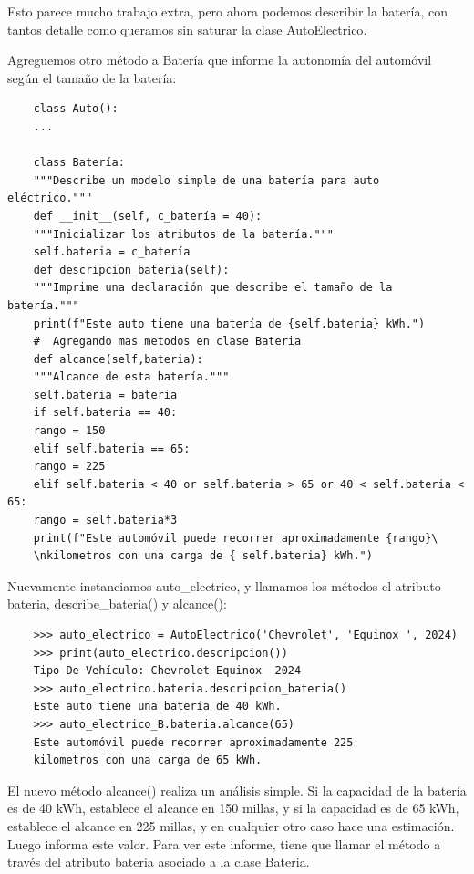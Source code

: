 {Esto parece mucho trabajo extra, pero ahora podemos describir la batería, 
con tantos detalle como queramos sin saturar la clase {\ttfamily AutoElectrico}. 

Agreguemos otro método a Batería que informe la autonomía del automóvil según el tamaño de la batería:

\hspace{-2.7cm}{\ttfamily \scriptsize composicion}

\vspace{-0.2cm}
\hspace{-2.3cm}{\ttfamily \scriptsize \_Auto.py}\vspace{-0.88cm}
\begin{lstlisting}
	class Auto():
	...
	
	class Batería:
	"""Describe un modelo simple de una batería para auto eléctrico."""
	def __init__(self, c_batería = 40):
	"""Inicializar los atributos de la batería."""
	self.bateria = c_batería
	def descripcion_bateria(self):
	"""Imprime una declaración que describe el tamaño de la batería."""        
	print(f"Este auto tiene una batería de {self.bateria} kWh.")
	#  Agregando mas metodos en clase Bateria
	def alcance(self,bateria):
	"""Alcance de esta batería."""
	self.bateria = bateria
	if self.bateria == 40:
	rango = 150
	elif self.bateria == 65:
	rango = 225
	elif self.bateria < 40 or self.bateria > 65 or 40 < self.bateria < 65:
	rango = self.bateria*3
	print(f"Este automóvil puede recorrer aproximadamente {rango}\
	\nkilometros con una carga de { self.bateria} kWh.")
\end{lstlisting}

Nuevamente instanciamos {\ttfamily auto\_electrico}, y llamamos los métodos el atributo {\ttfamily  bateria}, {\ttfamily  describe\_bateria()}  y {\ttfamily alcance()}:

\begin{lstlisting}
	>>> auto_electrico = AutoElectrico('Chevrolet', 'Equinox ', 2024)
	>>> print(auto_electrico.descripcion())
	Tipo De Vehículo: Chevrolet Equinox  2024
	>>> auto_electrico.bateria.descripcion_bateria()
	Este auto tiene una batería de 40 kWh.
	>>> auto_electrico_B.bateria.alcance(65)
	Este automóvil puede recorrer aproximadamente 225
	kilometros con una carga de 65 kWh.
\end{lstlisting}










El nuevo método {\ttfamily alcance()} realiza un análisis simple. Si la capacidad de la batería es de 40 kWh, establece el alcance en 150 millas, y si la capacidad es de 65 kWh, establece el alcance en 225 millas, y en cualquier otro caso hace una estimación. Luego informa este valor. Para ver este informe, tiene que llamar el método a través del atributo {\ttfamily bateria} asociado a la clase  {\ttfamily Bateria}.

}
